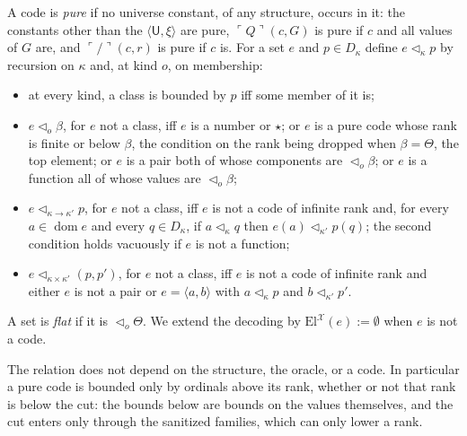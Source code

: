 \documentclass[10pt]{article}
\newcommand{\dom}{\operatorname{dom}}
\newcommand{\El}{\mathrm{El}}
\newcommand{\code}[1]{\ulcorner #1\urcorner}
\newcommand{\X}{\mathcal{X}}
\begin{document}
\begin{definition}\label{def:lhd}
A code is \emph{pure} if no universe constant, of any structure, occurs
in it: the constants other than the $\langle\mathsf U,\xi\rangle$ are pure,
$\code Q(c,G)$ is pure if $c$ and all values of $G$ are, and $\code/(c,r)$
is pure if $c$ is. For a set $e$ and $p\in D_\kappa$ define $e\lhd_\kappa p$ by
recursion on $\kappa$ and, at kind $o$, on membership:
\begin{itemize}
\item at every kind, a class is bounded by $p$ iff some member of it is;
\item $e\lhd_o\beta$, for $e$ not a class, iff $e$ is a number or $\star$;
  or $e$ is a pure code whose rank is finite or below $\beta$, the
  condition on the rank being dropped when $\beta=\Theta$, the top
  element; or $e$ is a pair both of whose components are
  $\lhd_o\beta$; or $e$ is a function all of whose values are
  $\lhd_o\beta$;
\item $e\lhd_{\kappa\to\kappa'}p$, for $e$ not a class, iff $e$ is not a code
  of infinite rank and, for every $a\in\dom e$ and every $q\in D_\kappa$,
  if $a\lhd_\kappa q$ then $e(a)\lhd_{\kappa'}p(q)$; the second condition
  holds vacuously if $e$ is not a function;
\item $e\lhd_{\kappa\times\kappa'}(p,p')$, for $e$ not a class, iff $e$ is
  not a code of infinite rank and either $e$ is not a pair or
  $e=\langle a,b\rangle$ with $a\lhd_\kappa p$ and $b\lhd_{\kappa'}p'$.
\end{itemize}
A set is \emph{flat} if it is $\lhd_o\Theta$. We extend the decoding by
$\El^\X(e):=\emptyset$ when $e$ is not a code.
\end{definition}

The relation does not depend on the structure, the oracle, or a code.
In particular a pure code is bounded only by ordinals above its rank,
whether or not that rank is below the cut: the bounds below are bounds
on the values themselves, and the cut enters only through the
sanitized families, which can only lower a rank.
\end{document}
